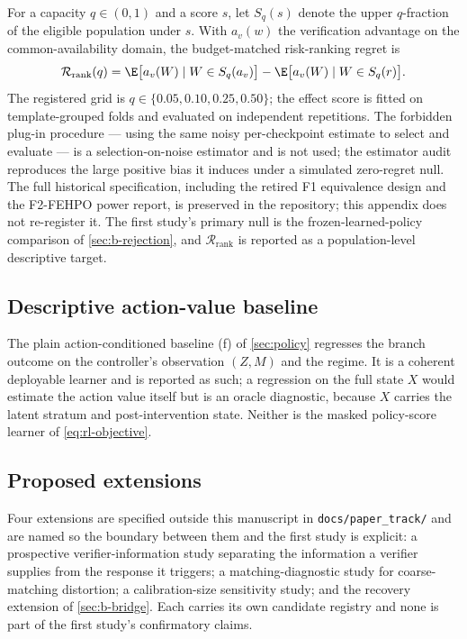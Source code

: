For a capacity $q\in(0,1)$ and a score $s$, let $S_q(s)$ denote the upper
$q$-fraction of the eligible population under $s$.  With $a_v(w)$ the
verification advantage on the common-availability domain, the budget-matched
risk-ranking regret is
\begin{equation}
 \mathcal R_{\mathrm{rank}}(q)
 =\E\big[a_v(W)\mid W\in S_q(a_v)\big]-\E\big[a_v(W)\mid W\in S_q(r)\big].
 \label{eq:b-rank-regret}
\end{equation}
The registered grid is $q\in\{0.05,0.10,0.25,0.50\}$; the effect score is fitted
on template-grouped folds and evaluated on independent repetitions.  The
forbidden plug-in procedure --- using the same noisy per-checkpoint estimate to
select and evaluate --- is a selection-on-noise estimator and is not used; the
estimator audit reproduces the large positive bias it induces under a
simulated zero-regret null.  The full historical specification, including the
retired F1 equivalence design and the F2-FEHPO power report, is preserved in
the repository; this appendix does not re-register it.  The first study's
primary null is the frozen-learned-policy comparison of
\cref{sec:b-rejection}, and $\mathcal R_{\mathrm{rank}}$ is reported as a
population-level descriptive target.

\subsection{Descriptive action-value baseline}
\label{app:label-use}

The plain action-conditioned baseline (f) of \cref{sec:policy} regresses the
branch outcome on the controller's observation $(Z,M)$ and the regime.  It is a
coherent deployable learner and is reported as such; a regression on the full
state $X$ would estimate the action value itself but is an oracle diagnostic,
because $X$ carries the latent stratum and post-intervention state.  Neither is
the masked policy-score learner of \cref{eq:rl-objective}.

\subsection{Proposed extensions}
\label{app:extensions}

Four extensions are specified outside this manuscript in
\texttt{docs/paper\_track/} and are named so the boundary between them and the
first study is explicit: a prospective verifier-information study separating
the information a verifier supplies from the response it triggers; a
matching-diagnostic study for coarse-matching distortion; a calibration-size
sensitivity study; and the recovery extension of \cref{sec:b-bridge}.  Each
carries its own candidate registry and none is part of the first study's
confirmatory claims.
